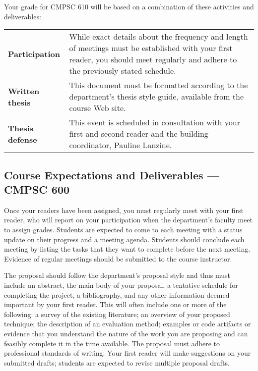 \newpage
\noindent
Your grade for CMPSC 610 will be based on a combination of these activities and deliverables:
\begin{center}
\begin{tabular}{lp{4in}}
\bf Participation & While exact details about the frequency and length of meetings must be established with your first
reader, you should meet regularly and adhere to the previously stated schedule. \\[.1in]

\bf Written thesis & This document must be formatted according to the department's thesis style guide, available from
the course Web site. \\[.1in]

\bf Thesis defense & This event is scheduled in consultation with your first and second reader and the building
coordinator, Pauline Lanzine. \\[.1in]

% 
\end{tabular}
\end{center}

\subsection*{Course Expectations and Deliverables --- CMPSC 600}

\medskip
{} Once your readers have been assigned, you must regularly meet with your first reader, who
will report on your participation when the department's faculty meet to assign grades.  Students are expected to come to
each meeting with a status update on their progress and a meeting agenda.  Students should conclude each meeting by
listing the tasks that they want to complete before the next meeting. Evidence of regular meetings should be submitted
to the course instructor. 

\medskip
{}
The proposal should follow the department's proposal style and thus must include an abstract, the main body of your
proposal, a tentative schedule for completing the project, a bibliography, and any other information deemed important by
your first reader. This will often include one or more of the following: a survey of the existing literature; an overview of
your proposed technique; the description of an evaluation method; examples or code artifacts or evidence that you
understand the nature of the work you are proposing and can feasibly complete it in the time available. 
The proposal must adhere to professional standards of writing. Your first reader will make suggestions on your submitted
drafts; students are expected to revise multiple proposal drafts.

